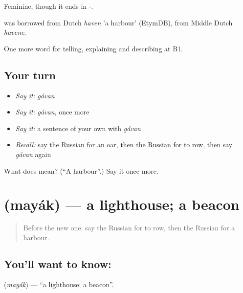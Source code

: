 Feminine, though it ends in -.

\begin{cousinweb}
\emph{} was borrowed from Dutch \emph{haven} 'a harbour' (EtymDB), from Middle Dutch \emph{havene}.
\end{cousinweb}

\begin{grammarlens}[title={What you've built}]
One more word for telling, explaining and describing at B1.
\end{grammarlens}

\subsection*{Your turn}
\begin{itemize}
\raggedright
  \item \emph{Say it:} \emph{gávan}
  \item \emph{Say it:} \emph{gávan}, once more
  \item \emph{Say it:} a sentence of your own with \emph{gávan}
  \item \emph{Recall:} say the Russian for an oar, then the Russian for to row, then say \emph{gávan} again
\end{itemize}

\begin{tcolorbox}[breakable,colback=teal!4,colframe=teal!35!black,title={Before you move on}]
What does  mean? (\textquotedblleft{}A harbour\textquotedblright{}.) Say it once more.
\end{tcolorbox}
\section[\texorpdfstring{\ru{маяк} (mayák)}{маяк (mayák)}]{ (mayák) — a lighthouse; a beacon}

\label{lesson:RU-C427-mayak}



\begin{quote}
Before the new one: say the Russian for to row, then the Russian for a harbour.
\end{quote}

\subsection*{You'll want to know: }
\textbf{} (\emph{mayák}) — \textquotedblleft{}a lighthouse; a beacon\textquotedblright{}.

